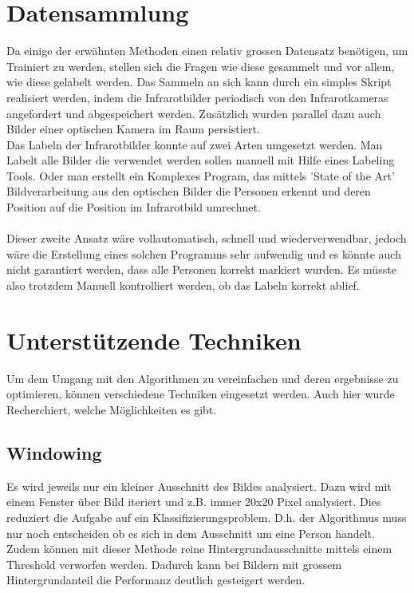 \section{Datensammlung}

Da einige der erwähnten Methoden einen relativ grossen Datensatz benötigen, um Trainiert zu werden, stellen sich die Fragen wie diese gesammelt und vor allem, wie diese gelabelt werden. Das Sammeln an sich kann durch ein simples Skript realisiert werden, indem die Infrarotbilder periodisch von den Infrarotkameras angefordert und abgespeichert werden. Zusätzlich wurden parallel dazu auch Bilder einer optischen Kamera im Raum persistiert.\\
Das Labeln der Infrarotbilder konnte auf zwei Arten umgesetzt werden. Man Labelt alle Bilder die verwendet werden sollen manuell mit Hilfe eines Labeling Tools. Oder man erstellt ein Komplexes Program, das mittels 'State of the Art' Bildverarbeitung aus den optischen Bilder die Personen erkennt und deren Position auf die Position im Infrarotbild umrechnet.\\
\\
Dieser zweite Ansatz wäre vollautomatisch, schnell und wiederverwendbar, jedoch wäre die Erstellung eines solchen Programms sehr aufwendig und es könnte auch nicht garantiert werden, dass alle Personen korrekt markiert wurden. Es müsste also trotzdem Manuell kontrolliert werden, ob das Labeln korrekt ablief. 


\section{Unterstützende Techniken}

Um dem Umgang mit den Algorithmen zu vereinfachen und deren ergebnisse zu optimieren, können verschiedene Techniken eingesetzt werden. Auch hier wurde Recherchiert, welche Möglichkeiten es gibt.


\subsection{Windowing}

Es wird jeweils nur ein kleiner Ausschnitt des Bildes analysiert. Dazu wird mit einem Fenster über Bild iteriert und z.B. immer 20x20 Pixel analysiert. Dies reduziert die Aufgabe auf ein Klassifizierungsproblem. D.h. der Algorithmus muss nur noch entscheiden ob es sich in dem Ausschnitt um eine Person handelt. Zudem können mit dieser Methode reine Hintergrundausschnitte mittels einem Threshold verworfen werden. Dadurch kann bei Bildern mit grossem Hintergrundanteil die Performanz deutlich gesteigert werden.


